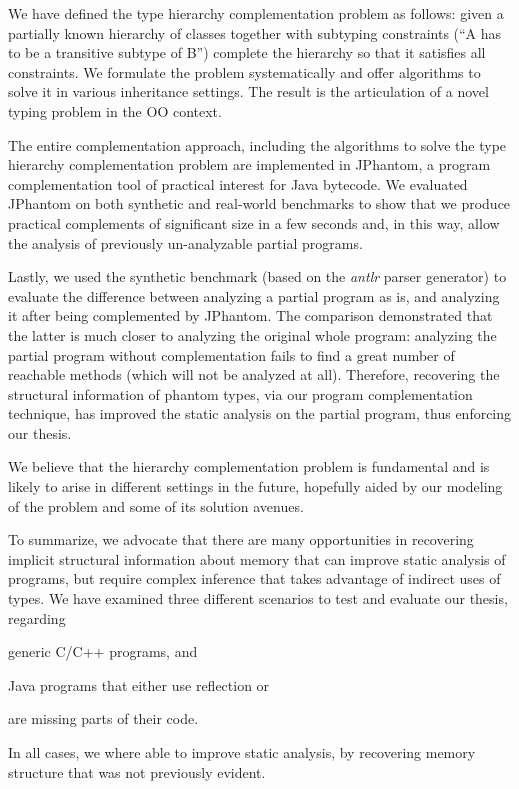We have defined the type hierarchy complementation problem as follows:
given a partially known hierarchy of classes together with subtyping
constraints (``A has to be a transitive subtype of B'') complete the
hierarchy so that it satisfies all constraints. We formulate the
problem systematically and offer algorithms to solve it in various
inheritance settings. The result is the articulation of a novel typing
problem in the OO context.

The entire complementation approach, including the algorithms to solve
the type hierarchy complementation problem are implemented in
JPhantom, a program complementation tool of practical interest for
Java bytecode.
%
We evaluated JPhantom on both synthetic and real-world benchmarks to
show that we produce practical complements of significant size in a
few seconds and, in this way, allow the analysis of previously
un-analyzable partial programs.

Lastly, we used the synthetic benchmark (based on the \emph{antlr}
parser generator) to evaluate the difference between analyzing a
partial program as is, and analyzing it after being complemented by
JPhantom. The comparison demonstrated that the latter is much closer
to analyzing the original whole program: analyzing the partial program
without complementation fails to find a great number of reachable
methods (which will not be analyzed at all). Therefore, recovering the
structural information of phantom types, via our program
complementation technique, has improved the static analysis on the
partial program, thus enforcing our thesis.

We believe that the hierarchy complementation problem is fundamental
and is likely to arise in different settings in the future, hopefully
aided by our modeling of the problem and some of its solution avenues.

To summarize, we advocate that there are many opportunities in
recovering implicit structural information about memory that can
improve static analysis of programs, but require complex inference
that takes advantage of indirect uses of types. We have examined three
different scenarios to test and evaluate our thesis, regarding
\begin{inparablank}
\item generic C/C++ programs, and
\item Java programs that either use reflection or
\item are missing parts of their code.
\end{inparablank}
In all cases, we where able to improve static analysis, by recovering
memory structure that was not previously evident.






